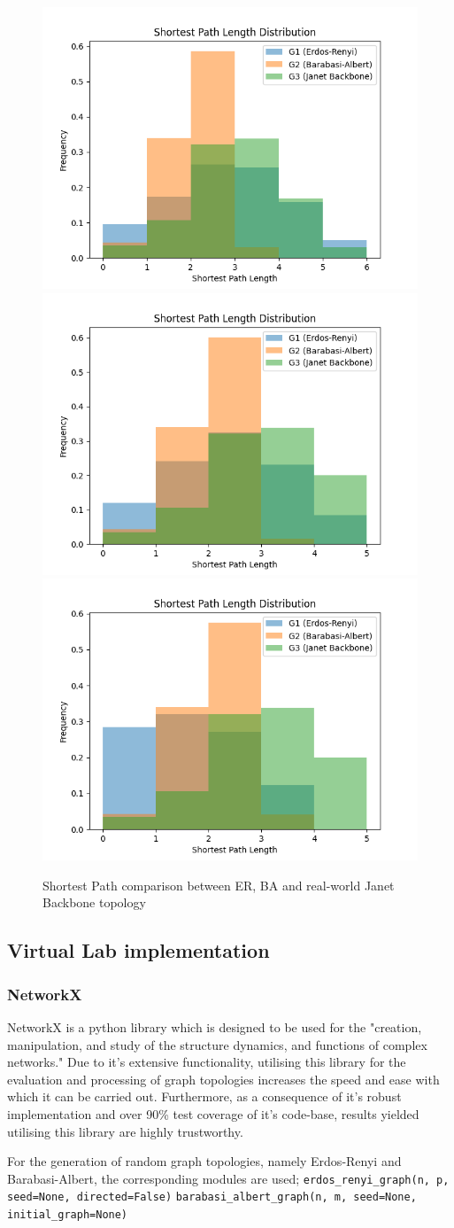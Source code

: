\begin{figure}
\centering
\includegraphics[width=.3\textwidth]{images/topo_comparison/janet1.png}\hfill
\includegraphics[width=.3\textwidth]{images/topo_comparison/janet2.png}\hfill
\includegraphics[width=.3\textwidth]{images/topo_comparison/janet3.png}
\caption{Shortest Path comparison between ER, BA and real-world Janet Backbone topology}
\label{fig:shortest_path_comp}
\end{figure}


\subsection{Virtual Lab implementation}

\subsubsection{NetworkX}
NetworkX is a python library which is designed to be used for the "creation, manipulation, and study of the structure dynamics, and functions of complex networks." \cite{networkX} Due to it's extensive functionality, utilising this library for the evaluation and processing of graph topologies increases the speed and ease with which it can be carried out. Furthermore, as a consequence of it's robust implementation and over 90\% test coverage of it's code-base, results yielded utilising this library are highly trustworthy. 

For the generation of random graph topologies, namely Erdos-Renyi and Barabasi-Albert, the corresponding modules are used; \newline
\verb|erdos_renyi_graph(n, p, seed=None, directed=False)| 
\verb|barabasi_albert_graph(n, m, seed=None, initial_graph=None)| 

